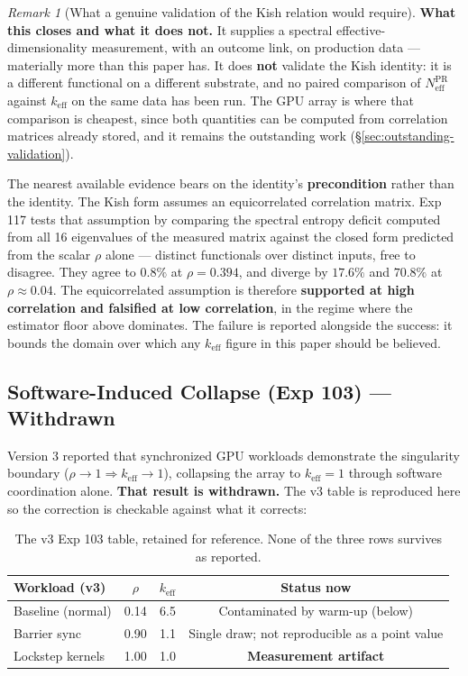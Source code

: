 \documentclass[11pt,a4paper]{article}
\theoremstyle{definition}
\theoremstyle{remark}
\newtheorem{remark}{Remark}[section]
\newcommand{\keff}{k_{\text{eff}}}
\begin{document}
\begin{remark}[What a genuine validation of the Kish relation would require]
\textbf{What this closes and what it does not.} It supplies a spectral effective-dimensionality measurement, with an outcome link, on production data --- materially more than this paper has. It does \textbf{not} validate the Kish identity: it is a different functional on a different substrate, and no paired comparison of $N_{\text{eff}}^{\text{PR}}$ against $\keff$ on the same data has been run. The GPU array is where that comparison is cheapest, since both quantities can be computed from correlation matrices already stored, and it remains the outstanding work (\S\ref{sec:outstanding-validation}).

The nearest available evidence bears on the identity's \textbf{precondition} rather than the identity. The Kish form assumes an equicorrelated correlation matrix. Exp 117 tests that assumption by comparing the spectral entropy deficit computed from all 16 eigenvalues of the measured matrix against the closed form predicted from the scalar $\rho$ alone --- distinct functionals over distinct inputs, free to disagree. They agree to $0.8\%$ at $\rho = 0.394$, and diverge by $17.6\%$ and $70.8\%$ at $\rho \approx 0.04$. The equicorrelated assumption is therefore \textbf{supported at high correlation and falsified at low correlation}, in the regime where the estimator floor above dominates. The failure is reported alongside the success: it bounds the domain over which any $\keff$ figure in this paper should be believed.
\end{remark}

\subsection{Software-Induced Collapse (Exp 103) --- Withdrawn}
\label{sec:exp103}

Version 3 reported that synchronized GPU workloads demonstrate the singularity boundary
($\rho \to 1 \Rightarrow \keff \to 1$), collapsing the array to $\keff = 1$ through software
coordination alone. \textbf{That result is withdrawn.} The v3 table is reproduced here so the
correction is checkable against what it corrects:

\begin{table}[H]
\centering
\begin{tabular}{lccc}
\toprule
\textbf{Workload (v3)} & \textbf{$\rho$} & \textbf{$\keff$} & \textbf{Status now} \\
\midrule
Baseline (normal) & 0.14 & 6.5 & Contaminated by warm-up (below) \\
Barrier sync & 0.90 & 1.1 & Single draw; not reproducible as a point value \\
Lockstep kernels & 1.00 & 1.0 & \textbf{Measurement artifact} \\
\bottomrule
\end{tabular}
\caption{The v3 Exp 103 table, retained for reference. None of the three rows survives as reported.}
\end{table}
\end{document}
